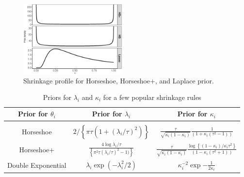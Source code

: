 \documentclass[11pt]{article}
\numberwithin{equation}{section}
\begin{document}
\begin{figure}[!ht]
\centering
\includegraphics[width=0.48\textwidth]{figs/prior_diff_kappa}
\caption{\footnotesize{Shrinkage profile for Horseshoe, Horseshoe+, and Laplace prior.}}
\label{fig:priorkappa}
\end{figure}

\begin{table}[!ht]
\centering
\caption{Priors for $\lambda_i$ and $\kappa_i$ for a few popular shrinkage rules}
\begin{tabular}{ccc}
\hline
Prior for $\theta_i$ & Prior for $\lambda_i$ & Prior for $\kappa_i$ \\ 
\hline \\
Horseshoe & $2/ \left\{ \pi \tau (1 + (\lambda_i/\tau)^2 )\right\}$  & $\frac{\tau}{\sqrt{\kappa_i (1-\kappa_i )}} \frac{1}{(1+\kappa_i (\tau^2 -1 ) )}$ \\[10pt]
Horseshoe+ & $\frac{4\log \lambda_i/\tau}{\left\{{\pi^2 \tau}(\lambda_i/\tau)^2 -1)\right\}}$ &  $\frac{\tau}{\sqrt{\kappa_i (1-\kappa_i )}}\frac{\log \left \{ ( 1 - \kappa_i ) / \kappa_i \tau^2 \right \}}{ (1-\kappa_i (\tau^2 +1 ))}$ \\[10pt]
Double Exponential & $\lambda_i \exp (-\lambda_i^2/2)$ & $\kappa_i^{-2} \exp{-\frac{1}{2\kappa_i}}$ \\
\hline 
\end{tabular}
\end{table}
\end{document}
